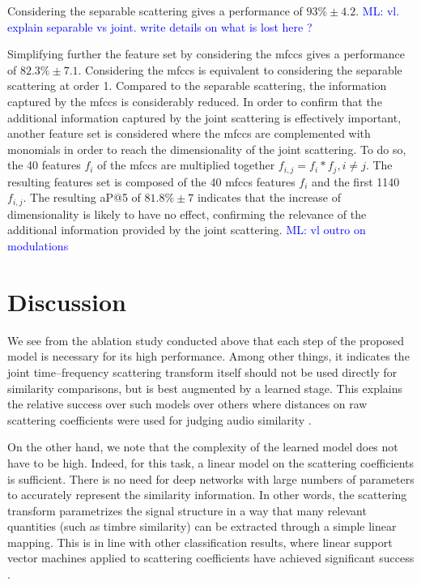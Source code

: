 \documentclass{bmcart}
\newcommand{\ml}[1]{\textcolor{blue}{ML: #1}}
\begin{document}
Considering the separable scattering gives a performance of $93\% \pm 4.2$. \ml{ vl. explain separable vs joint. write details on what is lost here ?}

Simplifying further the feature set by considering the mfccs gives a performance of $82.3\% \pm 7.1$. Considering the mfccs is equivalent to considering the separable scattering at order 1. Compared to the separable scattering, the information captured by the mfccs is considerably reduced. In order to confirm that the additional information captured by the joint scattering is effectively important, another feature set is considered where the mfccs are complemented with monomials in order to reach the dimensionality of the joint scattering. To do so, the 40 features $f_i$ of the mfccs are multiplied together $f_{i, j} = f_i*f_j, i \neq j$. The resulting features set is composed of the 40 mfccs features $f_i$ and the first 1140 $f_{i, j}$. The resulting aP@5 of $81.8\% \pm 7$ indicates that the increase of dimensionality is likely to have no effect, confirming the relevance of the additional information provided by the joint scattering. \ml{vl outro on modulations}

\section*{Discussion}
\label{sec:discussion}

We see from the ablation study conducted above that each step of the proposed model is necessary for its high performance.
Among other things, it indicates the joint time--frequency scattering transform itself should not be used directly for similarity comparisons, but is best augmented by a learned stage.
This explains the relative success over such models \cite{lostanlen2018relevance,lostanlen2018extended} over others where distances on raw scattering coefficients were used for judging audio similarity \cite{bauge2013representing}.

On the other hand, we note that the complexity of the learned model does not have to be high.
Indeed, for this task, a linear model on the scattering coefficients is sufficient.
There is no need for deep networks with large numbers of parameters to accurately represent the similarity information.
In other words, the scattering transform parametrizes the signal structure in a way that many relevant quantities (such as timbre similarity) can be extracted through a simple linear mapping.
This is in line with other classification results, where linear support vector machines applied to scattering coefficients have achieved significant success \cite{anden2015joint,anden2019joint}.
\end{document}
